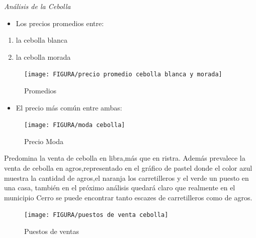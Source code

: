 \documentclass[10pt]{beamer}
\begin{document}
   	
   	\begin{frame}{\textit{Análisis de la Cebolla}}
   		
   		\begin{itemize}
   			\item{ Los precios promedios entre:}
   		\end{itemize}
   		
   		
   		\begin{enumerate}
   			\item {la cebolla blanca}
   			\item{la cebolla morada}
   		\end{enumerate}
   	  
   	  
   	  \begin{figure}[h]
   	  	\centering
   	  	\texttt{[image: FIGURA/precio promedio cebolla blanca y morada]}
   	  	\caption{Promedios}
   	  	\label{fig:precio-promedio-cebolla-blanca-y-morada}
   	  \end{figure}
   	  
  	\end{frame}
   	
   	
   	\begin{frame}
   		 \begin{itemize}
   			\item{El precio más común entre ambas:}
   		\end{itemize}
   		
   		\begin{figure}
   			\centering
   			\texttt{[image: FIGURA/moda cebolla]}
   			\caption{Precio Moda}
   			\label{fig:moda-cebolla}
   		\end{figure}
   \end{frame}		
   		
   	\begin{frame}
   		
   		Predomina la venta de cebolla en libra,más que en ristra.
   		Además prevalece la venta de cebolla en agros,representado en el gráfico de pastel donde el color azul muestra la cantidad de agros,el naranja los carretilleros y el  verde un puesto en una casa, también en el próximo análisis quedará claro que realmente en el municipio  Cerro se puede encontrar tanto escazes de carretilleros como de agros.
   		
   		\begin{figure}
   			\centering
   			\texttt{[image: FIGURA/puestos de venta cebolla]}
   			\caption{Puestos de ventas}
   			\label{fig:puestos-de-venta-cebolla}
   		\end{figure}
   		
   	\end{frame}
   		
\end{document}
